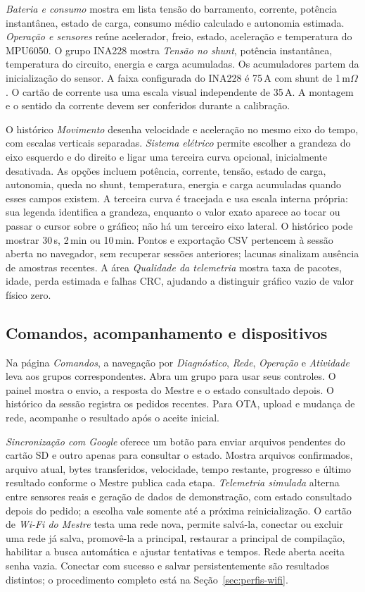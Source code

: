 \emph{Bateria e consumo} mostra em lista tensão do barramento, corrente, potência instantânea, estado de carga, consumo médio calculado e autonomia estimada. \emph{Operação e sensores} reúne acelerador, freio, estado, aceleração e temperatura do MPU6050. O grupo INA228 mostra \emph{Tensão no shunt}, potência instantânea, temperatura do circuito, energia e carga acumuladas. Os acumuladores partem da inicialização do sensor. A faixa configurada do INA228 é 75\,A com shunt de 1\,m$\Omega$. O cartão de corrente usa uma escala visual independente de 35\,A. A montagem e o sentido da corrente devem ser conferidos durante a calibração.

O histórico \emph{Movimento} desenha velocidade e aceleração no mesmo eixo do tempo, com escalas verticais separadas. \emph{Sistema elétrico} permite escolher a grandeza do eixo esquerdo e do direito e ligar uma terceira curva opcional, inicialmente desativada. As opções incluem potência, corrente, tensão, estado de carga, autonomia, queda no shunt, temperatura, energia e carga acumuladas quando esses campos existem. A terceira curva é tracejada e usa escala interna própria: sua legenda identifica a grandeza, enquanto o valor exato aparece ao tocar ou passar o cursor sobre o gráfico; não há um terceiro eixo lateral. O histórico pode mostrar 30\,s, 2\,min ou 10\,min. Pontos e exportação CSV pertencem à sessão aberta no navegador, sem recuperar sessões anteriores; lacunas sinalizam ausência de amostras recentes. A área \emph{Qualidade da telemetria} mostra taxa de pacotes, idade, perda estimada e falhas CRC, ajudando a distinguir gráfico vazio de valor físico zero.

\subsection{Comandos, acompanhamento e dispositivos}
Na página \emph{Comandos}, a navegação por \emph{Diagnóstico}, \emph{Rede}, \emph{Operação} e \emph{Atividade} leva aos grupos correspondentes. Abra um grupo para usar seus controles. O painel mostra o envio, a resposta do Mestre e o estado consultado depois. O histórico da sessão registra os pedidos recentes. Para OTA, upload e mudança de rede, acompanhe o resultado após o aceite inicial.

\emph{Sincronização com Google} oferece um botão para enviar arquivos pendentes do cartão SD e outro apenas para consultar o estado. Mostra arquivos confirmados, arquivo atual, bytes transferidos, velocidade, tempo restante, progresso e último resultado conforme o Mestre publica cada etapa. \emph{Telemetria simulada} alterna entre sensores reais e geração de dados de demonstração, com estado consultado depois do pedido; a escolha vale somente até a próxima reinicialização. O cartão de \emph{Wi-Fi do Mestre} testa uma rede nova, permite salvá-la, conectar ou excluir uma rede já salva, promovê-la a principal, restaurar a principal de compilação, habilitar a busca automática e ajustar tentativas e tempos. Rede aberta aceita senha vazia. Conectar com sucesso e salvar persistentemente são resultados distintos; o procedimento completo está na Seção~\ref{sec:perfis-wifi}.

